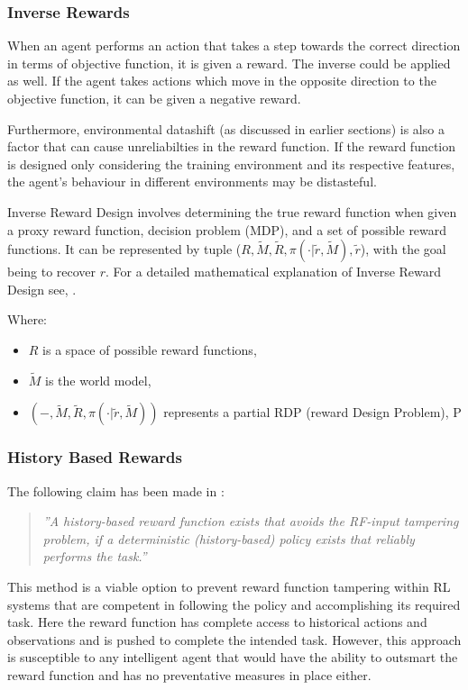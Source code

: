 \subsubsection{Inverse Rewards}
When an agent performs an action that takes a step towards the correct direction in terms of objective function, it is given a reward.
The inverse could be applied as well. If the agent takes actions which move in the opposite direction to the objective function, it can be given a negative reward.

Furthermore, environmental datashift (as discussed in earlier sections) is also a factor that can cause unreliabilties in the reward function.
If the reward function is designed only considering the training environment and its respective features, the agent's behaviour in different environments may be distasteful.

Inverse Reward Design involves determining the true reward function when given a proxy reward function, decision problem (MDP), and a set of possible reward functions.
It can be represented by tuple ($R, \tilde{M}, \tilde{R}, \pi(\cdot|\tilde{r}, \tilde{M}), \tilde{r}$),
with the goal being to recover $r$.
For a detailed mathematical explanation of Inverse Reward Design see, \cite{inverse-reward}.

Where:
\begin{itemize}
    \item $R$ is a space of possible reward functions,
    \item $\tilde{M}$ is the world model,
    \item $(-, \tilde{M}, \tilde{R}, \pi(\cdot|\tilde{r},\tilde{M}))$ represents a partial RDP (reward Design Problem), P
\end{itemize}



\subsubsection{History Based Rewards}
The following claim has been made in \cite{DBLP:journals/corr/abs-1908-04734}:
\begin{quote}
    \emph{''A history-based reward function exists that avoids the RF-input tampering
    problem, if a deterministic (history-based) policy exists that reliably performs the task.''}
\end{quote}

This method is a viable option to prevent reward function tampering within RL systems that are competent in following the policy and accomplishing its required task.
Here the reward function has complete access to historical actions and observations and is pushed to complete the intended task.
However, this approach is susceptible to any intelligent agent that would have the ability to outsmart the reward function and has no preventative measures in place either.

